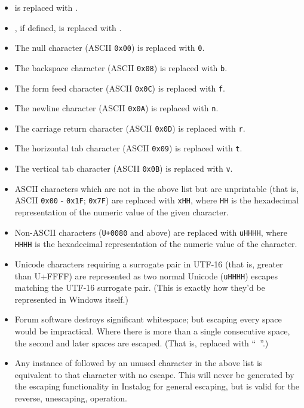 \begin{itemize}
    \item {} is replaced with
    .
    \item {}, if defined,  is replaced with
    .
    \item The null character (ASCII \verb|0x00|) is replaced with
    \texttt{0}.
    \item The backspace character (ASCII \verb|0x08|) is replaced with
    \texttt{b}.
    \item The form feed character (ASCII \verb|0x0C|) is replaced with
    \texttt{f}.
    \item The newline character (ASCII \verb|0x0A|) is replaced with
    \texttt{n}.
    \item The carriage return character (ASCII \verb|0x0D|) is replaced with
    \texttt{r}.
    \item The horizontal tab character (ASCII \verb|0x09|) is replaced with
    \texttt{t}.
    \item The vertical tab character (ASCII \verb|0x0B|) is replaced with
    \texttt{v}.
    \item ASCII characters which are not in the above list but are unprintable
    (that is, ASCII \verb|0x00| - \verb|0x1F|; \verb|0x7F|) are
    replaced with \texttt{xHH}, where \texttt{HH} is the
    hexadecimal representation of the numeric value of the given character.
    \item Non-ASCII characters (\verb|U+0080| and above) are replaced with
    \texttt{uHHHH}, where \texttt{HHHH} is the hexadecimal
    representation of the numeric value of the character.
    \item Unicode characters requiring a surrogate pair in UTF-16 (that is,
    greater than U+FFFF) are represented as two normal Unicode
    (\texttt{uHHHH}) escapes matching the UTF-16 surrogate
    pair. (This is exactly how they'd be represented in Windows itself.)
    \item Forum software destroys significant whitespace; but escaping every
    space would be impractical. Where there is more than a single consecutive
    space, the second and later spaces are escaped. (That is, replaced with
    ``\texttt{ }''.)
    \item Any instance of  followed by an unused character
    in the above list is equivalent to that character with no escape. This will
    never be generated by the escaping functionality in Instalog for general
    escaping, but is valid for the reverse, unescaping, operation.
\end{itemize}

